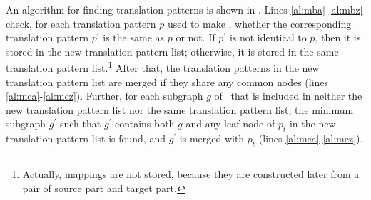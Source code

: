 An algorithm for finding translation patterns is shown in . 
Lines \ref{al:mba}-\ref{al:mbz} check, for each translation pattern $p$ used
to make \Dt, whether the corresponding translation pattern $p^{\prime}$ is the
same as $p$ or not.  If $p^{\prime}$ is not identical to $p$, then it is
stored in the new translation pattern list; otherwise, it is stored in the
same translation pattern list.\footnote{Actually, mappings are not stored,
because they are constructed later from a pair of source part and target
part.} After that, the translation patterns in the new translation pattern
list are merged if they share any common nodes (lines
\ref{al:mca}-\ref{al:mcz}). Further, for each subgraph $g$ of \Dc\ that is
included in neither the new translation pattern list nor the same translation
pattern list, the minimum subgraph $g^{\prime}$ such that $g^{\prime}$
contains both $g$ and any leaf node of $p_t$ in the new translation pattern
list is found, and $g^{\prime}$ is merged with $p_t$ (lines
\ref{al:mea}-\ref{al:mez}).

